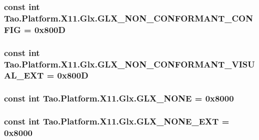 \label{class_tao_1_1_platform_1_1_x11_1_1_glx_a4964628e8c7c0a05fa0c8cf3739770b7}
\hypertarget{class_tao_1_1_platform_1_1_x11_1_1_glx_a1e338432449cbc213a3a4c2673123ca0}{
\subsubsection[{GLX\_\-NON\_\-CONFORMANT\_\-CONFIG}]{\setlength{\rightskip}{0pt plus 5cm}const int {\bf Tao.Platform.X11.Glx.GLX\_\-NON\_\-CONFORMANT\_\-CONFIG} = 0x800D}}
\label{class_tao_1_1_platform_1_1_x11_1_1_glx_a1e338432449cbc213a3a4c2673123ca0}
\hypertarget{class_tao_1_1_platform_1_1_x11_1_1_glx_af52ed35e6d62a6b15c0b1c8146f39325}{
\subsubsection[{GLX\_\-NON\_\-CONFORMANT\_\-VISUAL\_\-EXT}]{\setlength{\rightskip}{0pt plus 5cm}const int {\bf Tao.Platform.X11.Glx.GLX\_\-NON\_\-CONFORMANT\_\-VISUAL\_\-EXT} = 0x800D}}
\label{class_tao_1_1_platform_1_1_x11_1_1_glx_af52ed35e6d62a6b15c0b1c8146f39325}
\hypertarget{class_tao_1_1_platform_1_1_x11_1_1_glx_a51737dacb361ecb25c36db057d0646d1}{
\subsubsection[{GLX\_\-NONE}]{\setlength{\rightskip}{0pt plus 5cm}const int {\bf Tao.Platform.X11.Glx.GLX\_\-NONE} = 0x8000}}
\label{class_tao_1_1_platform_1_1_x11_1_1_glx_a51737dacb361ecb25c36db057d0646d1}
\hypertarget{class_tao_1_1_platform_1_1_x11_1_1_glx_ab4845c9111062972b88a73f6115539a8}{
\subsubsection[{GLX\_\-NONE\_\-EXT}]{\setlength{\rightskip}{0pt plus 5cm}const int {\bf Tao.Platform.X11.Glx.GLX\_\-NONE\_\-EXT} = 0x8000}}
